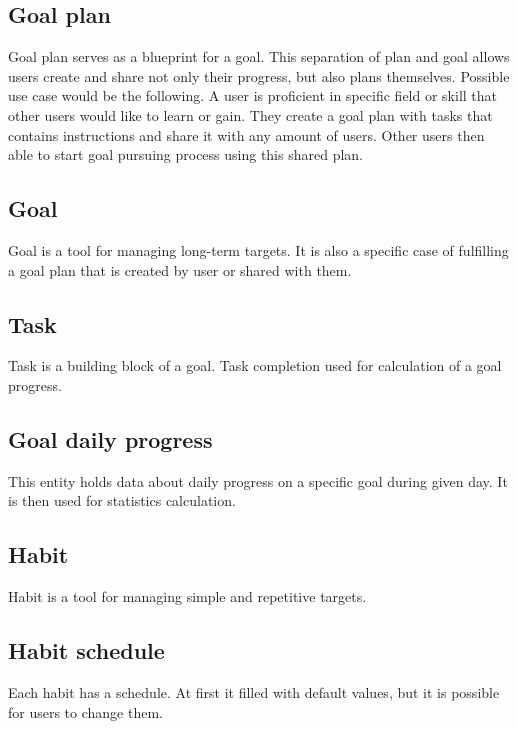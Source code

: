 \subsection{Goal plan}\label{subsec:goal-plan}

Goal plan serves as a blueprint for a goal.
This separation of plan and goal allows users create and share not only their progress, but also plans themselves.
Possible use case would be the following.
A user is proficient in specific field or skill that other users would like to learn or gain.
They create a goal plan with tasks that contains instructions and share it with any amount of users.
Other users then able to start goal pursuing process using this shared plan.

\subsection{Goal}\label{subsec:goal}

Goal is a tool for managing long-term targets.
It is also a specific case of fulfilling a goal plan that is created by user or shared with them.

\subsection{Task}\label{subsec:task}

Task is a building block of a goal.
Task completion used for calculation of a goal progress.

\subsection{Goal daily progress}\label{subsec:goal-daily-progess}

This entity holds data about daily progress on a specific goal during given day.
It is then used for statistics calculation.

\subsection{Habit}\label{subsec:habit}

Habit is a tool for managing simple and repetitive targets.

\subsection{Habit schedule}\label{subsec:habit-schedule}

Each habit has a schedule.
At first it filled with default values, but it is possible for users to change them.

